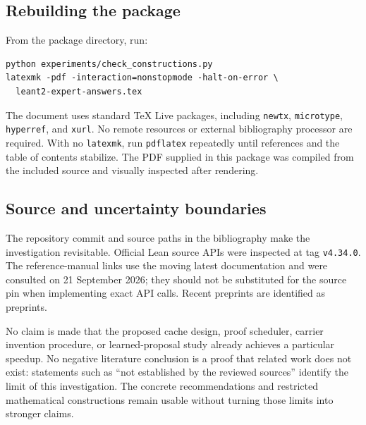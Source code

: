 \documentclass[11pt,a4paper]{article}
\theoremstyle{definition}
\theoremstyle{remark}
\newcommand{\code}[1]{\texttt{#1}}
\begin{document}
\subsection{Rebuilding the package}
From the package directory, run:
\par\noindent\begin{minipage}{\linewidth}
\begin{lstlisting}
python experiments/check_constructions.py
latexmk -pdf -interaction=nonstopmode -halt-on-error \
  leant2-expert-answers.tex
\end{lstlisting}
\end{minipage}\par
The document uses standard TeX Live packages, including \code{newtx},
\code{microtype}, \code{hyperref}, and \code{xurl}. No remote resources or external
bibliography processor are required. With no \code{latexmk}, run
\code{pdflatex} repeatedly until references and the table of contents stabilize.
The PDF supplied in this package was compiled from the included source and
visually inspected after rendering.

\subsection{Source and uncertainty boundaries}
The repository commit and source paths in the bibliography make the investigation
revisitable. Official Lean source APIs were inspected at tag \code{v4.34.0}.
The reference-manual links use the moving latest documentation and were consulted
on 21 September 2026; they should not be substituted for the source pin when
implementing exact API calls. Recent preprints are identified as preprints.

No claim is made that the proposed cache design, proof scheduler, carrier
invention procedure, or learned-proposal study already achieves a particular
speedup. No negative literature conclusion is a proof that related work does
not exist: statements such as ``not established by the reviewed sources''
identify the limit of this investigation. The concrete recommendations and
restricted mathematical constructions remain usable without turning those
limits into stronger claims.
\end{document}
